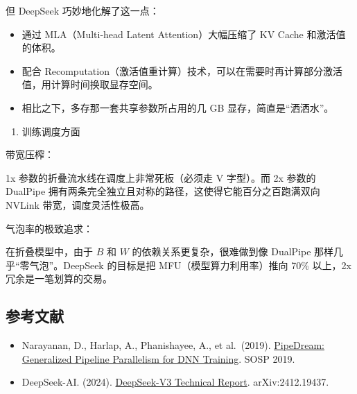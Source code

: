 但 DeepSeek 巧妙地化解了这一点：

\begin{itemize}
\tightlist
\item
  通过 MLA（Multi-head Latent Attention）大幅压缩了 KV Cache 和激活值的体积。
\item
  配合 Recomputation（激活值重计算）技术，可以在需要时再计算部分激活值，用计算时间换取显存空间。
\item
  相比之下，多存那一套共享参数所占用的几 GB 显存，简直是``洒洒水''。
\end{itemize}

\begin{enumerate}
\def\labelenumi{\arabic{enumi}.}
\setcounter{enumi}{2}
\tightlist
\item
  训练调度方面
\end{enumerate}

带宽压榨：

1x 参数的折叠流水线在调度上非常死板（必须走 V 字型）。而 2x 参数的 DualPipe 拥有两条完全独立且对称的路径，这使得它能百分之百跑满双向 NVLink 带宽，调度灵活性极高。

气泡率的极致追求：

在折叠模型中，由于 \(B\) 和 \(W\) 的依赖关系更复杂，很难做到像 DualPipe 那样几乎``零气泡''。DeepSeek 的目标是把 MFU（模型算力利用率）推向 70\% 以上，2x 冗余是一笔划算的交易。

\hypertarget{ux53c2ux8003ux6587ux732e-35}{%
\subsection{参考文献}\label{ux53c2ux8003ux6587ux732e-35}}

\begin{itemize}
\tightlist
\item
  Narayanan, D., Harlap, A., Phanishayee, A., et al.~(2019). \href{https://dl.acm.org/doi/10.1145/3341301.3359646}{PipeDream: Generalized Pipeline Parallelism for DNN Training}. SOSP 2019.
\item
  DeepSeek-AI. (2024). \href{https://arxiv.org/abs/2412.19437}{DeepSeek-V3 Technical Report}. arXiv:2412.19437.
\end{itemize}

\clearpage
